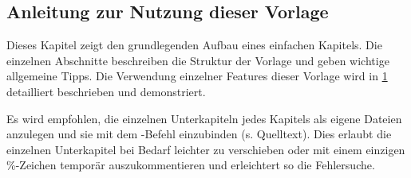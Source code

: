 %
\begin{showExamples}%
%
\chapter{Anleitung zur Nutzung dieser Vorlage}%
\label{chap:Examples}
%
%
Dieses Kapitel zeigt den grundlegenden Aufbau eines einfachen Kapitels.
Die einzelnen Abschnitte beschreiben die Struktur der Vorlage und geben wichtige allgemeine Tipps.
Die Verwendung einzelner Features dieser Vorlage wird in \cref{chap:Examples} detailliert beschrieben und demonstriert.

Es wird empfohlen, die einzelnen Unterkapiteln jedes Kapitels als eigene Dateien anzulegen und sie mit dem \verb++-Befehl einzubinden (s. Quelltext).
Dies erlaubt die einzelnen Unterkapitel bei Bedarf leichter zu verschieben oder mit einem einzigen \%-Zeichen temporär auszukommentieren und erleichtert so die Fehlersuche.


\end{showExamples}
